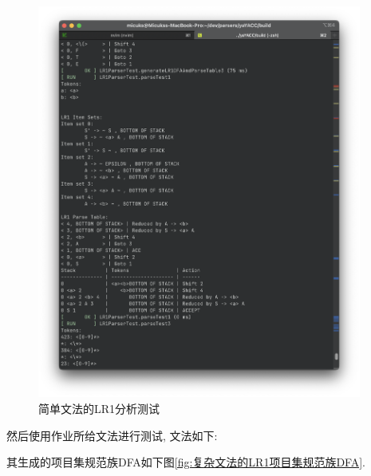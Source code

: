 \begin{figure}[ht!]
	\begin{center}
		\includegraphics[width=0.95\textwidth]{figures/lr1分析1.png}
	\end{center}
	\caption{简单文法的LR1分析测试}
	\label{fig:简单文法的LR1分析测试}
\end{figure}

然后使用作业所给文法进行测试, 文法如下:


其生成的项目集规范族DFA如下图\ref{fig:复杂文法的LR1项目集规范族DFA}.

